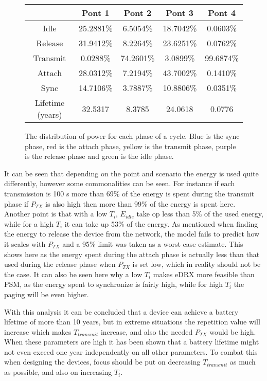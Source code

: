 \begin{figure}[H]
\begin{minipage}{0.48\textwidth}
\begin{table}[H]
{\begin{tabular}{|c|c|c|c|c|}
 & Pont 1	& Pont 2	& Pont 3	& Pont 4	\\ \hline
\cellcolor{mycolor5}Idle	& 25.2881\% 	& 6.5054\%	& 18.7042\%	& 0.0603\%\\ \hline
\cellcolor{mycolor4}Release	& 31.9412\% 	& 8.2264\%	& 23.6251\%	& 0.0762\%\\ \hline
\cellcolor{mycolor3}Transmit	& 0.0288\% 	& 74.2601\%	& 3.0899\%	& 99.6874\%\\ \hline
\cellcolor{mycolor2}Attach	& 28.0312\% 	& 7.2194\%	& 43.7002\%	& 0.1410\%\\ \hline
\cellcolor{mycolor1}Sync	& 14.7106\% 	& 3.7887\%	& 10.8806\%	& 0.0351\%\\ \hline
Lifetime (years)	& 32.5317 	& 8.3785	& 24.0618	& 0.0776\\ \hline
\end{tabular}}
\end{table}
\end{minipage}
\caption{The distribution of power for each phase of a cycle. Blue is the sync phase, red is the attach phase, yellow is the transmit phase, purple is the release phase and green is the idle phase.}
\label{fig:barplot_plots}
\end{figure}

It can be seen that depending on the point and scenario the energy is used quite differently, however some commonalities can be seen. For instance if each transmission is 100 s more than 69\% of the energy is spent during the transmit phase if $P_{TX}$ is also high then more than 99\% of the energy is spent here. Another point is that with a low $T_i$, $E_{idle}$ take op less than 5\% of the used energy, while for a high $T_i$ it can take up 53\% of the energy. As mentioned when finding the energy to release the device from the network, the model fails to predict how it scales with $P_{TX}$ and a 95\% limit was taken as a worst case estimate. This shows here as the energy spent during the attach phase is actually less than that used during the release phase when $P_{TX}$ is set low, which in reality should not be the case. It can also be seen here why a low $T_i$ makes eDRX more feasible than PSM, as the energy spent to synchronize is fairly high, while for high $T_i$ the paging will be even higher.  

With this analysis it can be concluded that a device can achieve a battery lifetime of more than 10 years, but in extreme situations the repetition value will increase which makes $T_{transmit}$ increase, and also the needed $P_{TX}$ would be high. When these parameters are high it has been shown that a battery lifetime might not even exceed one year independently on all other parameters. To combat this when designing the devices, focus should be put on decreasing $T_{transmit}$ as much as possible, and also on increasing $T_i$. 
